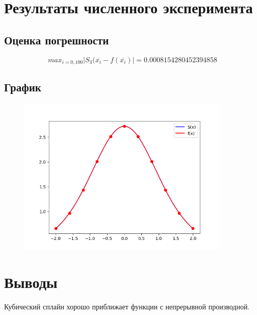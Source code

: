 \documentclass{article}
\begin{document}
\section*{Результаты численного эксперимента}

\subsection*{Оценка погрешности}
\begin{equation*}
    max_{i=0,100} \left|S_3(\overline{x_i} - f(\overline{x_i}) \right| = 0.0008154280452394858
\end{equation*}
\subsection*{График}
\begin{figure}[H]
\caption{}
\centering
\includegraphics[width=0.9\textwidth]{figure}
\end{figure}

\section*{Выводы}
Кубический сплайн хорошо приближает функции с непрерывной производной.
\end{document}
